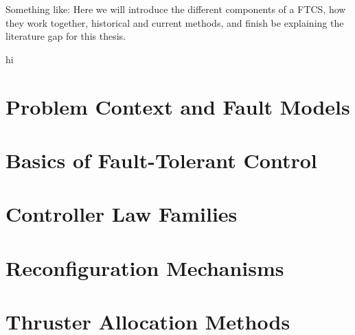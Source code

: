 {
\let\clearpage\relax
\let\newpage\relax
\let\pagebreak\relax

\begin{tcolorbox}[  colback=cyan!30!white,     %
  colframe=black,            %
  coltitle=white,            %
  fontupper = \small \bfseries,
  fonttitle=\bfseries,       %
  title=Draft Note,       %
  width=\textwidth,          %
  boxrule=1pt,               %
  arc=5pt,                   %
  center,
  width = 0.9\textwidth]
  
  Something like: Here we will introduce the different components of a \gls{FTCS}, how they work together, historical and current methods, and finish be explaining the literature gap for this thesis.

\end{tcolorbox}

\begin{tcolorbox}
    hi
\end{tcolorbox}
    

\section{Problem Context and Fault Models}


\section{Basics of Fault-Tolerant Control}


\section{Controller Law Families}



\section{Reconfiguration Mechanisms}


\section{Thruster Allocation Methods}



}

